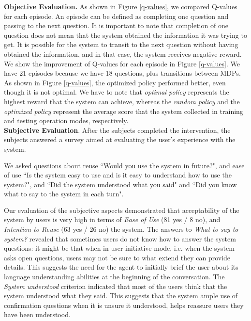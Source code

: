 \documentclass[letterpaper]{article}
\begin{document}
{\bf Objective Evaluation.}  
As shown in Figure \ref{q-values}, we compared Q-values for each episode. An episode can be defined as completing one question and passing to the next question. It is important to note that completion of one question does not mean that the system obtained the information it was trying to get. It is possible for the system to transit to the next question without having obtained the information, and in that case, the system receives negative reward. 
We show the improvement of Q-values for each episode in Figure \ref{q-values}. We have  21 episodes because we have 18 questions, plus transitions between MDPs. As shown in Figure \ref{q-values}, the optimized policy performed better, even though it is not optimal. We have to note that \textit{optimal policy} represents the highest reward that the system can achieve, whereas the \textit{random policy} and the \textit{optimized policy} represent the average score that the system collected in training and testing operation modes, respectively.\\


{\bf Subjective Evaluation}. After the subjects completed the intervention, the subjects answered a survey aimed at evaluating the user's experience with the system. 

We asked questions about reuse ``Would you use the system in future?", and ease of use ``Is the system easy to use and is it easy to understand how to use the system?", and ``Did the system understood what you said" and ``Did you know what to say to the system in each turn".

Our evaluation of the subjective aspects  
demonstrated that acceptability of the system by users is very high in terms of {\em Ease of Use} (81 yes / 8 no), and {\em Intention to Reuse} (63 yes / 26 no)
the system. The answers to {\em What to say to system?} revealed that sometimes users do not know how to answer the system questions: it might be that when in user initiative mode, i.e. when the system asks open questions, users may not be sure to what extend they can provide details. This suggests the need for the agent to initially brief the user about its language understanding abilities at the beginning of the conversation.
The {\em System understood} criterion indicated that most of the users think that the system understood what they said.  This suggests that the system ample use of confirmation questions when it is unsure it understood, helps reassure users they have been understood.
\end{document}
